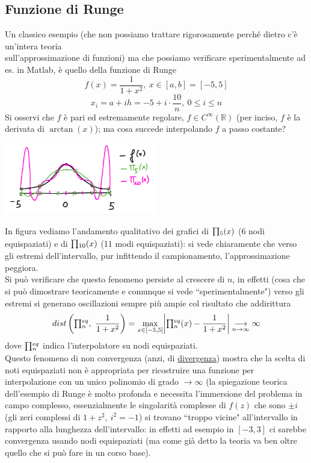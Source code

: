 \subsection{Funzione di Runge}
Un classico esempio (che non possiamo trattare rigorosamente perché dietro c'è un'intera teoria\\ sull'approssimazione di funzioni) ma che possiamo verificare sperimentalmente ad es. in Matlab, è quello della funzione di Runge
\[ f(x) = \frac{1}{1+x^2}, \ x \in [a,b] = [-5,5] \]
\[ x_i = a+ih = -5+i \cdot \frac{10}{n}, \ 0 \leq i \leq n \]
Si osservi che $f$ è pari ed estremamente
regolare, $f \in C^\infty (\mathbb{R})$ (per inciso, $f$ è la derivata di $\arctan(x)$); ma cosa succede interpolando $f$ a passo costante?
\begin{center}
    \includegraphics[width=0.5\textwidth]{foto/lez12_img5}
\end{center}
In figura vediamo l'andamento qualitativo dei grafici di $\begin{matrix}\prod\end{matrix}_5(x)$ (6 nodi equispaziati) e di $\begin{matrix}\prod\end{matrix}_{10}(x)$ (11 modi equispaziati): si vede chiaramente che verso gli estremi dell'intervallo, pur infittendo il campionamento, l'approssimazione peggiora.\\
Si può verificare che questo fenomeno persiste al crescere di $n$, in effetti (cosa che si può dimostrare teoricamente e comunque si vede ``sperimentalmente") verso gli estremi si generano oscillazioni sempre più ampie col risultato che addirittura
\[ dist\left(\inter_n^{eq},\ \frac{1}{1+x^2}\right) = \max_{x \in [-5,5]} \abs*{\inter_n^{eq}(x) - \frac{1}{1+x^2}}\underset{n \to \infty}{\longrightarrow} \infty \]
dove $\begin{matrix}\prod\end{matrix}_n^{eq}$ indica l'interpolatore su nodi equispaziati.\\
Questo fenomeno di non convergenza (anzi, di \uline{divergenza}) mostra che la scelta di noti equispaziati non è appropriata per ricostruire una funzione per interpolazione con un unico polinomio di grado $\to \infty$
(la spiegazione teorica dell'esempio di Runge è molto profonda e necessita l'immersione del problema in campo complesso, essenzialmente le singolarità complesse di $f(z)$ che sono $\pm i$ (gli zeri complessi di $1+z^2, \ i^2 = -1$) si trovano ``troppo vicine" all'intervallo in rapporto alla lunghezza dell'intervallo: in effetti ad esempio in $[-3,3]$ ci sarebbe convergenza usando nodi equispaziati (ma come già detto la teoria va ben oltre quello che si può fare in un corso base).\\
